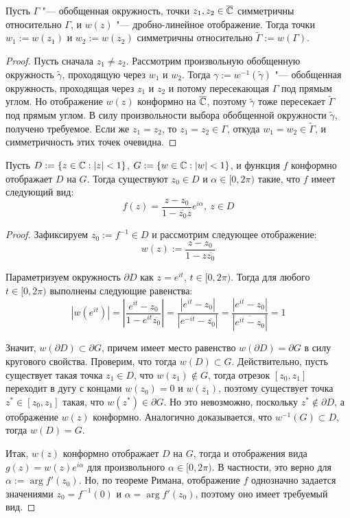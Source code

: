 \begin{proposition}
	Пусть $\Gamma$ "--- обобщенная окружность, точки $z_1, z_2 \in \overline{\mathbb{C}}$ симметричны относительно $\Gamma$, и $w(z)$ "--- дробно-линейное отображение. Тогда точки $w_1 := w(z_1)$ и $w_2  := w(z_2)$ симметричны относительно $\widetilde\Gamma := w(\Gamma)$.
\end{proposition}

\begin{proof}
	Пусть сначала $z_1 \ne z_2$. Рассмотрим произвольную обобщенную окружность $\widetilde{\gamma}$, проходящую через $w_1$ и $w_2$. Тогда $\gamma := w^{-1}(\widetilde\gamma)$ "--- обобщенная окружность, проходящая через $z_1$ и $z_2$ и потому пересекающая $\Gamma$ под прямым углом. Но отображение $w(z)$ конформно на $\overline{\mathbb{C}}$, поэтому $\widetilde \gamma$ тоже пересекает $\widetilde \Gamma$ под прямым углом. В силу произвольности выбора обобщенной окружности $\widetilde\gamma$, получено требуемое. Если же $z_1 = z_2$, то $z_1 = z_2 \in \Gamma$, откуда $w_1 = w_2 \in \widetilde\Gamma$, и симметричность этих точек очевидна.
\end{proof}

\begin{proposition}
	Пусть $D := \{z \in \mathbb{C}: |z| < 1\}$, $G := \{w \in \mathbb{C}: |w| < 1\}$, и функция $f$ конформно отображает $D$ на $G$. Тогда существуют $z_0 \in D$ и $\alpha \in [0, 2\pi)$ такие, что $f$ имеет следующий вид:
	\[f(z) = \frac{z - z_0}{1 - \overline{z_0}z}e^{i\alpha},~z \in D\]
\end{proposition}

\begin{proof}
	Зафиксируем $z_0 := f^{-1} \in D$ и рассмотрим следующее отображение:
	\[w(z) := \frac{z - z_0}{1 - z\overline{z_0}}\]
	
	Параметризуем окружность $\partial D$ как $z = e^{it}$, $t \in [0, 2\pi)$. Тогда для любого $t \in [0, 2\pi)$ выполнены следующие равенства:
	\[\left|w\left(e^{it}\right)\right| = \left|\frac{e^{it} - z_0}{1 - e^{it}\overline{z_0}}\right| = \frac{|e^{it} - z_0|}{|e^{-it} - \overline{z_0}|} = \frac{|e^{it} - z_0|}{|\overline{e^{it} - z_0}|} = 1\]
	
	Значит, $w(\partial D) \subset \partial G$, причем имеет место равенство  $w(\partial D) = \partial G$ в силу кругового свойства. Проверим, что тогда $w(D) \subset G$. Действительно, пусть существует такая точка $z_1 \in D$, что $w(z_1) \not\in G$, тогда отрезок $[z_0, z_1]$ переходит в дугу с концами $w(z_0) = 0$ и $w(z_1)$, поэтому существует точка $z^* \in [z_0, z_1]$ такая, что $w(z^*) \in \partial G$. Но это невозможно, поскольку $z^* \not \in \partial D$, а отображение $w(z)$ конформно. Аналогично доказывается, что $w^{-1}(G) \subset D$, тогда $w(D) = G$.
	
	Итак, $w(z)$ конформно отображает $D$ на $G$, тогда и отображения вида $g(z) = w(z)e^{i\alpha}$ для произвольного $\alpha \in [0, 2\pi)$. В частности, это верно для $\alpha := \arg{f'(z_0)}$. Но, по теореме Римана, отображение $f$ однозначно задается значениями $z_0 = f^{-1}(0)$ и $\alpha = \arg{f'(z_0)}$, поэтому оно имеет требуемый вид.
\end{proof}

